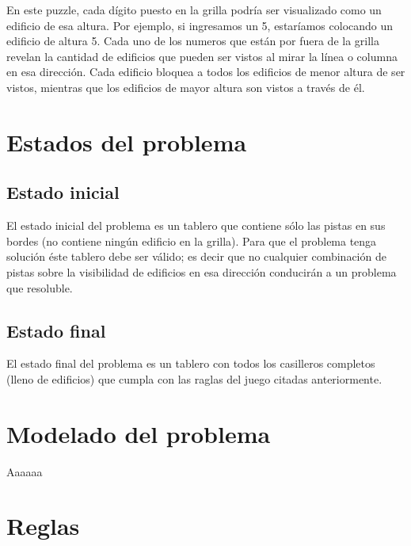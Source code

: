 \documentclass[%
	final,
	reprint,
	notitlepage,
	narroweqnarray,
	inline,
	twoside,
	invited
	]{ieee}
\begin{document}
\par En este puzzle, cada dígito puesto en la grilla podría ser visualizado como un edificio de esa altura. Por ejemplo, si ingresamos un 5, estaríamos colocando un edificio de altura 5. Cada uno de los numeros que están por fuera de la grilla revelan la cantidad de edificios que pueden ser vistos al mirar la línea o columna en esa dirección. Cada edificio bloquea a todos los edificios de menor altura de ser vistos, mientras que los edificios de mayor altura son vistos a través de él.


\section{Estados del problema}

\subsection{Estado inicial}

\par El estado inicial del problema es un tablero que contiene sólo las pistas en sus bordes (no contiene ningún edificio en la grilla). Para que el problema tenga solución éste tablero debe ser válido; es decir que no cualquier combinación de pistas sobre la visibilidad de edificios en esa dirección conducirán a un problema que resoluble.

\subsection{Estado final}

\par El estado final del problema es un tablero con todos los casilleros completos (lleno de edificios) que cumpla con las raglas del juego citadas anteriormente.

\section{Modelado del problema}

\par Aaaaaa

\section{Reglas}
\end{document}
